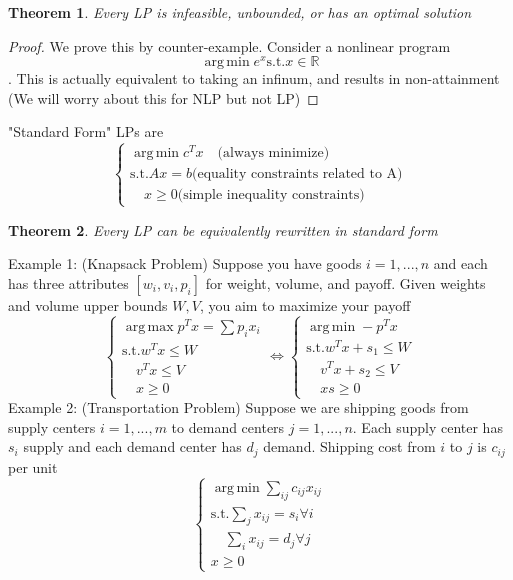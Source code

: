 \documentclass[12pt,oneside]{book}
\numberwithin{equation}{section}
\theoremstyle{definition}
\theoremstyle{plain}
\newtheorem{theorem}{Theorem}[section]
\theoremstyle{remark}
\newcommand{\R}{\mathbb{R}}
\newcommand{\argmin}{\operatorname*{arg\,min}}
\newcommand{\argmax}{\operatorname*{arg\,max}}
\begin{document}
\begin{theorem}
    Every LP is infeasible, unbounded, or has an optimal solution
\end{theorem}
\begin{proof}
    We prove this by counter-example. Consider a nonlinear program $$\argmin e^x \text{s.t.} x\in \R$$. This is actually equivalent to taking an infinum, and results in non-attainment (We will worry about this for NLP but not LP)
\end{proof}
"Standard Form" LPs are 
$$
\begin{cases}
    \argmin c^Tx \quad \text{(always minimize)} \\
    \text{s.t.} Ax=b \text{(equality constraints related to A)} \\
    \quad x \ge 0 \text{(simple inequality constraints)}
\end{cases}
$$
\begin{theorem} Every LP can be equivalently rewritten in standard form \end{theorem} 
\noindent Example 1: (Knapsack Problem) Suppose you have goods $i = 1,...,n$ and each has three attributes $[w_i, v_i, p_i]$ for weight, volume, and payoff. Given weights and volume upper bounds $W,V$, you aim to maximize your payoff
$$
\begin{cases}
    \argmax p^T x = \sum p_i x_i \\
    \text{s.t.} w^Tx\le W \\
    \quad v^Tx\le V \\
    \quad x \ge 0
\end{cases}
\iff
\begin{cases}
    \argmin -p^T x \\
    \text{s.t.} w^Tx + s_1 \le W \\
    \quad v^Tx + s_2 \le V \\
    \quad xs \ge 0
\end{cases}
$$
\noindent Example 2: (Transportation Problem) Suppose we are shipping goods from supply centers $i=1,...,m$ to demand centers $j=1,...,n$. Each supply center has $s_i$ supply and each demand center has $d_j$ demand. Shipping cost from $i$ to $j$ is $c_{ij}$ per unit
$$
\begin{cases}
    \argmin \sum_{ij} c_{ij}x_{ij} \\
    \text{s.t.} \sum_j x_{ij} = s_i \forall i \\
    \quad \sum_i x_{ij} = d_j \forall j \\
    x \ge 0
\end{cases}
$$
\end{document}
